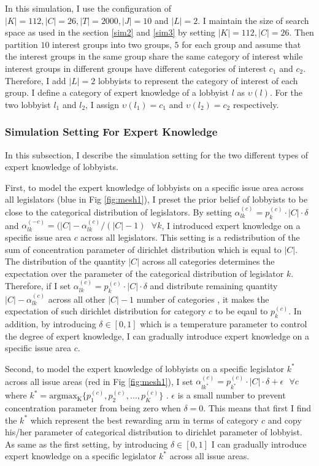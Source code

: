 \documentclass{article}
\begin{document}
In this simulation, 
I use the configuration of $|K|=112, |C|=26, |T|=2000, |J|=10$ and $|L|=2$. 
I maintain the size of search space as used in the section \ref{sim2} and \ref{sim3} by setting $|K|=112, |C|=26$.
Then partition $10$ interest groups 
into two groups, $5$ for each group and 
assume that the interest groups in the same group share the same category of interest 
while interest groups in different groups have different categories of interest $c_1$ and $c_2$.
Therefore, I add $|L|=2$ lobbyists to represent the 
category of interest of each group. I define a category of expert knowledge of a lobbyist $l$ as 
$\upsilon(l)$. For the two lobbyist $l_1$ and $l_2$, I assign $\upsilon(l_1) = c_1$ and $\upsilon(l_2) = c_2$ respectively.

\subsubsection{Simulation Setting For Expert Knowledge}
In this subsection, I describe the simulation setting for the two different types of expert knowledge of lobbyists.

First, to model the expert knowledge of lobbyists 
on a specific issue area across all legislators (blue in Fig \ref{fig:mesh1}),
I preset the prior belief of lobbyists to be close to the categorical distribution of legislators.
By setting $\alpha_{lk}^{(c)} = p_k^{(c)} \cdot |C| \cdot \delta $ and $\alpha_{lk}^{(-c)} = (|C| - \alpha_{lk}^{(c)}/(|C|-1) \text{ } \forall k$, 
I introduced expert knowledge on a specific issue area $c$ across all legislators.
This setting is a redistribution of the sum of concentration parameter of dirichlet distribution which is equal to $|C|$.
The distribution of the quantity $|C|$ across all categories determines the expectation over 
the parameter of the categorical distribution of legislator $k$. 
Therefore, if I set $\alpha_{lk}^{(c)} = p_k^{(c)} \cdot |C| \cdot \delta $ 
and distribute remaining quantity $|C| - \alpha_{lk}^{(c)}$ across all other $|C|-1$ number of categories ,
it makes the expectation of such dirichlet distribution for category $c$ to be eqaul to $p_k^{(c)}$.
In addition, by introducing $\delta \in [0,1]$ which is a temperature parameter to control the degree of expert knowledge,
I can gradually introduce expert knowledge on a specific issue area $c$.

Second, to model the expert knowledge of lobbyists 
on a specific legislator $k^*$ across all issue areas (red in Fig \ref{fig:mesh1}),
I set $\alpha_{lk^*}^{(c)} = p_{k^*}^{(c)}\cdot |C| \cdot \delta + \epsilon \text{  } \forall c$ where $k^* = \operatorname{argmax_K}\{p_1^{(c)}, p_2^{(c)}, \hdots, p_K^{(c)}\}$ .
$\epsilon$ is a small number to prevent concentration parameter from being zero when $\delta = 0$.
This means that first I find the $k^*$ which represent the best rewarding arm in terms of category $c$ and 
copy his/her parameter of categorical distribution to dirichlet parameter of lobbyist.
As same as the first setting, by introducing $\delta \in [0,1]$
I can gradually introduce expert knowledge on a specific legislator $k^*$ across all issue areas.
\end{document}

